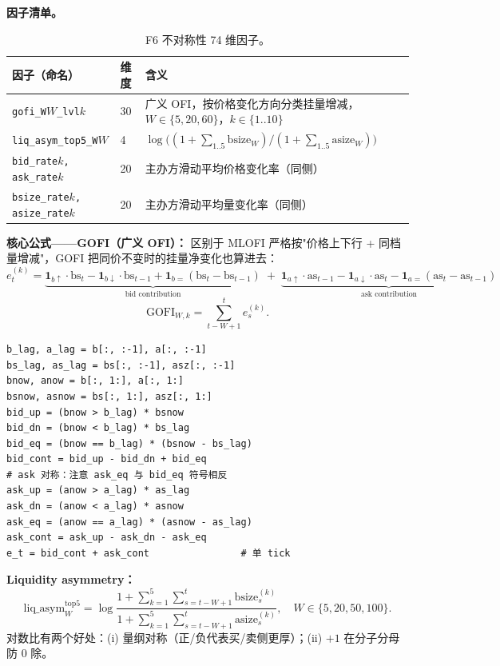\documentclass[10.5pt,a4paper]{article}
\begin{document}
\textbf{因子清单。}
\begin{table}[H]
\centering\small
\begin{tabular}{p{} p{} p{}}
\toprule
因子（命名） & 维度 & 含义 \\
\midrule
\texttt{gofi\_W$W$\_lvl$k$} & 30 & 广义 OFI，按价格变化方向分类挂量增减，$W\!\in\!\{5,20,60\}$，$k\!\in\!\{1..10\}$ \\
\texttt{liq\_asym\_top5\_W$W$} & 4 & $\log\big((1{+}\sum_{1..5}\mathrm{bsize}_W)/(1{+}\sum_{1..5}\mathrm{asize}_W)\big)$ \\
\texttt{bid\_rate$k$, ask\_rate$k$} & 20 & 主办方滑动平均价格变化率（同侧） \\
\texttt{bsize\_rate$k$, asize\_rate$k$} & 20 & 主办方滑动平均量变化率（同侧） \\
\bottomrule
\end{tabular}
\caption{F6 不对称性 74 维因子。}
\end{table}

\textbf{核心公式——GOFI（广义 OFI）：}
区别于 MLOFI 严格按"价格上下行 + 同档量增减"，GOFI 把同价不变时的挂量净变化也算进去：
\[
e^{(k)}_t = \underbrace{\mathbf{1}_{b\uparrow} \cdot \mathrm{bs}_t - \mathbf{1}_{b\downarrow} \cdot \mathrm{bs}_{t-1} + \mathbf{1}_{b=}(\mathrm{bs}_t - \mathrm{bs}_{t-1})}_{\text{bid contribution}}
\;+\;
\underbrace{\mathbf{1}_{a\uparrow} \cdot \mathrm{as}_{t-1} - \mathbf{1}_{a\downarrow} \cdot \mathrm{as}_t - \mathbf{1}_{a=}(\mathrm{as}_t - \mathrm{as}_{t-1})}_{\text{ask contribution}}
\]
\[
\mathrm{GOFI}_{W,k} = \sum_{t-W+1}^{t} e^{(k)}_s .
\]

\begin{lstlisting}
b_lag, a_lag = b[:, :-1], a[:, :-1]
bs_lag, as_lag = bs[:, :-1], asz[:, :-1]
bnow, anow = b[:, 1:], a[:, 1:]
bsnow, asnow = bs[:, 1:], asz[:, 1:]
bid_up = (bnow > b_lag) * bsnow
bid_dn = (bnow < b_lag) * bs_lag
bid_eq = (bnow == b_lag) * (bsnow - bs_lag)
bid_cont = bid_up - bid_dn + bid_eq
# ask 对称：注意 ask_eq 与 bid_eq 符号相反
ask_up = (anow > a_lag) * as_lag
ask_dn = (anow < a_lag) * asnow
ask_eq = (anow == a_lag) * (asnow - as_lag)
ask_cont = ask_up - ask_dn - ask_eq
e_t = bid_cont + ask_cont                # 单 tick
\end{lstlisting}

\textbf{Liquidity asymmetry：}
\[
\mathrm{liq\_asym}^{\text{top5}}_W = \log\frac{1+\sum_{k=1}^{5} \sum_{s=t-W+1}^{t}\mathrm{bsize}^{(k)}_s}
                                                {1+\sum_{k=1}^{5} \sum_{s=t-W+1}^{t}\mathrm{asize}^{(k)}_s},
\quad W\in\{5,20,50,100\} .
\]
对数比有两个好处：(i) 量纲对称（正/负代表买/卖侧更厚）；(ii) $+1$ 在分子分母防 0 除。
\end{document}
